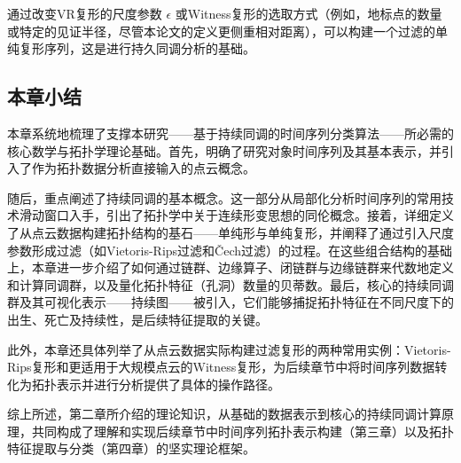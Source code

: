 通过改变VR复形的尺度参数 $\epsilon$ 或Witness复形的选取方式（例如，地标点的数量或特定的见证半径，尽管本论文的定义更侧重相对距离），可以构建一个过滤的单纯复形序列，这是进行持久同调分析的基础。
\subsection{本章小结}
本章系统地梳理了支撑本研究——基于持续同调的时间序列分类算法——所必需的核心数学与拓扑学理论基础。首先，明确了研究对象时间序列及其基本表示，并引入了作为拓扑数据分析直接输入的点云概念。

随后，重点阐述了持续同调的基本概念。这一部分从局部化分析时间序列的常用技术滑动窗口入手，引出了拓扑学中关于连续形变思想的同伦概念。接着，详细定义了从点云数据构建拓扑结构的基石——单纯形与单纯复形，并阐释了通过引入尺度参数形成过滤（如Vietoris-Rips过滤和Čech过滤）的过程。在这些组合结构的基础上，本章进一步介绍了如何通过链群、边缘算子、闭链群与边缘链群来代数地定义和计算同调群，以及量化拓扑特征（孔洞）数量的贝蒂数。最后，核心的持续同调群及其可视化表示——持续图——被引入，它们能够捕捉拓扑特征在不同尺度下的出生、死亡及持续性，是后续特征提取的关键。

此外，本章还具体列举了从点云数据实际构建过滤复形的两种常用实例：Vietoris-Rips复形和更适用于大规模点云的Witness复形，为后续章节中将时间序列数据转化为拓扑表示并进行分析提供了具体的操作路径。

综上所述，第二章所介绍的理论知识，从基础的数据表示到核心的持续同调计算原理，共同构成了理解和实现后续章节中时间序列拓扑表示构建（第三章）以及拓扑特征提取与分类（第四章）的坚实理论框架。